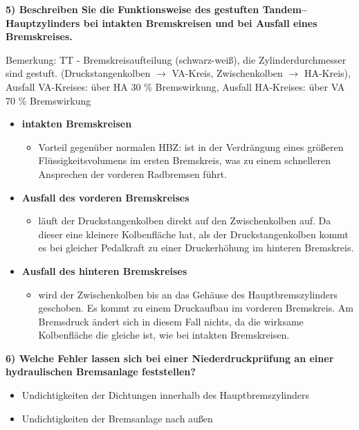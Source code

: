 \textbf{5) Beschreiben Sie die Funktionsweise des gestuften
Tandem--Hauptzylinders bei intakten Bremskreisen und bei Ausfall eines
Bremskreises.}

Bemerkung: TT - Bremskreisaufteilung (schwarz-weiß), die
Zylinderdurchmesser sind gestuft. (Druckstangenkolben $\to$ VA-Kreis,
Zwischenkolben $\to$ HA-Kreis), Ausfall VA-Kreises: über HA 30 \%
Bremswirkung, Ausfall HA-Kreises: über VA 70 \% Bremswirkung

\begin{itemize}
\item
  \textbf{intakten Bremskreisen}

  \begin{itemize}
  \item
    Vorteil gegenüber normalen HBZ: ist in der Verdrängung eines
    größeren Flüssigkeitsvolumens im ersten Bremskreis, was zu einem
    schnelleren Ansprechen der vorderen Radbremsen führt.
  \end{itemize}
\item
  \textbf{Ausfall des vorderen Bremskreises}

  \begin{itemize}
  \item
    läuft der Druckstangenkolben direkt auf den Zwischenkolben auf. Da
    dieser eine kleinere Kolbenfläche hat, als der Druckstangenkolben
    kommt es bei gleicher Pedalkraft zu einer Druckerhöhung im hinteren
    Bremskreis.
  \end{itemize}
\item
  \textbf{Ausfall des hinteren Bremskreises}

  \begin{itemize}
  \item
    wird der Zwischenkolben bis an das Gehäuse des Hauptbremszylinders
    geschoben. Es kommt zu einem Druckaufbau im vorderen Bremskreis. Am
    Bremsdruck ändert sich in diesem Fall nichts, da die wirksame
    Kolbenfläche die gleiche ist, wie bei intakten Bremskreisen.
  \end{itemize}
\end{itemize}

\textbf{6) Welche Fehler lassen sich bei einer Niederdruckprüfung an
einer hydraulischen Bremsanlage feststellen?}

\begin{itemize}
\item
  Undichtigkeiten der Dichtungen innerhalb des Hauptbremszylinders
\item
  Undichtigkeiten der Bremsanlage nach außen
\end{itemize}

